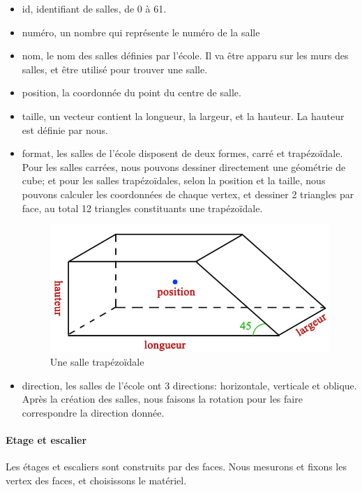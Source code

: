 \documentclass[twoside]{EPURapport}
\begin{document}
\begin{itemize}
	\item id, identifiant de salles, de 0 à 61.
    \item numéro, un nombre qui représente le numéro de la salle
   	\item nom, le nom des salles définies par l'école. Il va être apparu sur les murs des salles, et être utilisé pour trouver une salle.
    \item position, la coordonnée du point du centre de salle.
    \item taille, un vecteur contient la longueur, la largeur, et la hauteur. La hauteur est définie par nous.  
    \item format, les salles de l'école disposent de deux formes, carré et trapézoïdale. Pour les salles carrées, nous pouvons dessiner directement une géométrie de cube; et pour les salles trapézoïdales, selon la position et la taille, nous pouvons calculer les coordonnées de chaque vertex, et dessiner 2 triangles par face, au total 12 triangles constituants une trapézoïdale.
    
    \begin{figure}[!htbp]
	\centering
		\includegraphics[scale=0.4]{img/trapezoidale.jpg}
	\caption{Une salle trapézoïdale}
	\label{fig:salle}
	\end{figure}
    
    \item direction, les salles de l'école ont 3 directions: horizontale, verticale et oblique. Après la création des salles, nous faisons la rotation pour les faire correspondre la direction donnée. 
\end{itemize}

\paragraph{Etage et escalier}
Les étages et escaliers sont construits par des faces. Nous mesurons et fixons les vertex des faces, et choisissons le matériel.
\end{document}
